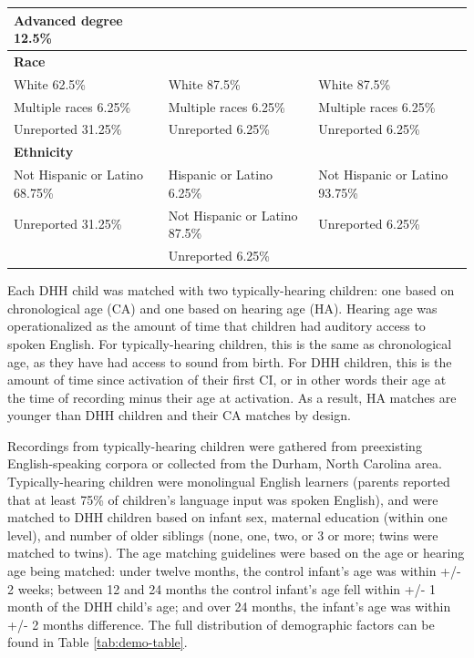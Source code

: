 \documentclass[
  man,floatsintext]{apa6}
\begin{document}
\begin{table}[H]
{\begin{tabular}[t]{l|l|l}
\hline
\hspace{1em}Advanced degree 12.5\% &  & \\
\hline
\multicolumn{3}{l}{\textbf{Race}}\\
\hline
\hspace{1em}White 62.5\% & White 87.5\% & White 87.5\%\\
\hline
\hspace{1em}Multiple races 6.25\% & Multiple races 6.25\% & Multiple races 6.25\%\\
\hline
\hspace{1em}Unreported 31.25\% & Unreported 6.25\% & Unreported 6.25\%\\
\hline
\multicolumn{3}{l}{\textbf{Ethnicity}}\\
\hline
\hspace{1em}Not Hispanic or Latino 68.75\% & Hispanic or Latino 6.25\% & Not Hispanic or Latino 93.75\%\\
\hline
\hspace{1em}Unreported 31.25\% & Not Hispanic or Latino 87.5\% & Unreported 6.25\%\\
\hline
\hspace{1em} & Unreported 6.25\% & \\
\hline
\end{tabular}}
\end{table}

Each DHH child was matched with two typically-hearing children: one based on chronological age (CA) and one based on hearing age (HA). Hearing age was operationalized as the amount of time that children had auditory access to spoken English. For typically-hearing children, this is the same as chronological age, as they have had access to sound from birth. For DHH children, this is the amount of time since activation of their first CI, or in other words their age at the time of recording minus their age at activation. As a result, HA matches are younger than DHH children and their CA matches by design.

Recordings from typically-hearing children were gathered from preexisting English-speaking corpora or collected from the Durham, North Carolina area. Typically-hearing children were monolingual English learners (parents reported that at least 75\% of children's language input was spoken English), and were matched to DHH children based on infant sex, maternal education (within one level), and number of older siblings (none, one, two, or 3 or more; twins were matched to twins). The age matching guidelines were based on the age or hearing age being matched: under twelve months, the control infant's age was within +/- 2 weeks; between 12 and 24 months the control infant's age fell within +/- 1 month of the DHH child's age; and over 24 months, the infant's age was within +/- 2 months difference. The full distribution of demographic factors can be found in Table \ref{tab:demo-table}.
\end{document}
